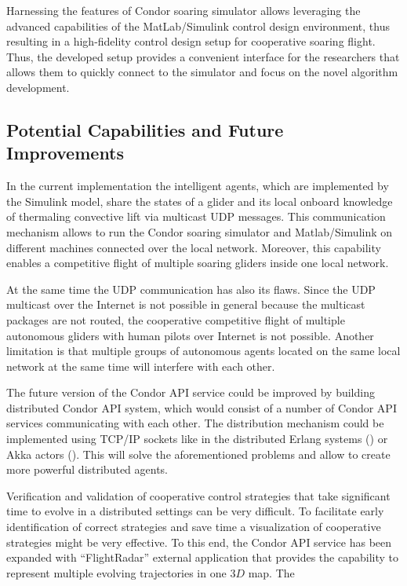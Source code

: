 \documentclass[letterpaper, 10 pt, conference]{ieeeconf}  %
\begin{document}
Harnessing the features of Condor soaring simulator allows leveraging the
advanced capabilities of the MatLab/Simulink control design environment, thus
resulting in a high-fidelity control design setup for cooperative soaring
flight. Thus, the developed setup provides a convenient interface for the
researchers that allows them to quickly connect to the simulator and focus on
the novel algorithm development.

\subsection{Potential Capabilities and Future Improvements}

In the current implementation the intelligent agents, which are implemented
by the Simulink model, share the states of a glider and its local onboard
knowledge of thermaling convective lift via multicast UDP messages. This
communication mechanism allows to run the Condor soaring simulator and
Matlab/Simulink on different machines connected over the local network.
Moreover, this capability enables a competitive flight of multiple soaring
gliders inside one local network.

At the same time the UDP communication has also its flaws. Since the UDP
multicast over the Internet is not possible in general because the multicast
packages are not routed, the cooperative competitive flight of multiple
autonomous gliders with human pilots over Internet is not possible. Another
limitation is that multiple groups of autonomous agents located on the same
local network at the same time will interfere with each other.

The future version of the Condor API service could be improved by building
distributed Condor API system, which would consist of a number of Condor API
services communicating with each other. The distribution mechanism could be
implemented using TCP/IP sockets like in the distributed Erlang systems
(\cite{Erlang:2013:Online}) or Akka actors (\cite{Akka:2013:Online}). This
will solve the aforementioned problems and allow to create more powerful
distributed agents.

Verification and validation of cooperative control strategies that take
significant time to evolve in a distributed settings can be very difficult.
To facilitate early identification of correct strategies and save time a
visualization of cooperative strategies might be very effective. To this end,
the Condor API service has been expanded with ``FlightRadar'' external
application that provides the capability to represent multiple evolving
trajectories in one $3D$ map. The
\end{document}
